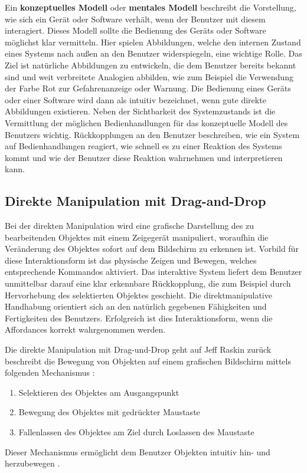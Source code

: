 Ein \textbf{konzeptuelles Modell} oder \textbf{mentales Modell} beschreibt die Vorstellung, wie sich ein Gerät oder Software verhält, wenn der Benutzer mit diesem interagiert. Dieses Modell sollte die Bedienung des Geräts oder Software möglichst klar vermitteln. Hier spielen Abbildungen, welche den internen Zustand eines Systems nach außen an den Benutzer widerspiegeln, eine wichtige Rolle. Das Ziel ist natürliche Abbildungen zu entwickeln, die dem Benutzer bereits bekannt sind und weit verbreitete Analogien abbilden, wie zum Beispiel die Verwendung der Farbe Rot zur Gefahrenanzeige oder Warnung. Die Bedienung eines Geräts oder einer Software wird dann als intuitiv bezeichnet, wenn gute direkte Abbildungen existieren. Neben der Sichtbarkeit des Systemzustands ist die Vermittlung der möglichen Bedienhandlungen für das konzeptuelle Modell des Benutzers wichtig. Rückkopplungen an den Benutzer beschreiben, wie ein System auf Bedienhandlungen reagiert, wie schnell es zu einer Reaktion des Systems kommt und wie der Benutzer diese Reaktion wahrnehmen und interpretieren kann. \cite[S. 136 ff.]{2010.Preim}

\subsection{Direkte Manipulation mit Drag-and-Drop}
Bei der direkten Manipulation wird eine grafische Darstellung des zu bearbeitenden Objektes mit einem Zeigegerät manipuliert, woraufhin die Veränderung des Objektes sofort auf dem Bildschirm zu erkennen ist. Vorbild für diese Interaktionsform ist das physische Zeigen und Bewegen, welches entsprechende Kommandos aktiviert. Das interaktive System liefert dem Benutzer unmittelbar darauf eine klar erkennbare Rückkopplung, die zum Beispiel durch Hervorhebung des selektierten Objektes geschieht. Die direktmanipulative Handhabung orientiert sich an den natürlich gegebenen Fähigkeiten und Fertigkeiten des Benutzers. Erfolgreich ist dies Interaktionsform, wenn die Affordances korrekt wahrgenommen werden. \cite[S. 351]{2010.Preim}

Die direkte Manipulation mit Drag-und-Drop geht auf Jeff Raskin zurück beschreibt die Bewegung von Objekten auf einem grafischen Bildschirm mittels folgenden Mechanismus \cite[S. 184]{2010.Preim}:
\begin{enumerate}
\item Selektieren des Objektes am Ausgangspunkt \cite[S. 184]{2010.Preim}
\item Bewegung des Objektes mit gedrückter Maustaste \cite[S. 184]{2010.Preim}
\item Fallenlassen des Objektes am Ziel durch Loslassen des Maustaste \cite[S. 184]{2010.Preim}
\end{enumerate}
Dieser Mechanismus ermöglicht dem Benutzer Objekten intuitiv hin- und herzubewegen \cite[S. 129]{2010.Preim}.

